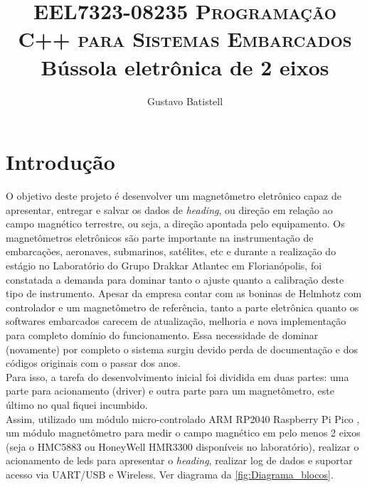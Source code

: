 \documentclass[10pt,twocolumn,letterpaper]{article}
\title{
		\usefont{OT1}{bch}{b}{n}
		\normalfont \normalsize \textsc{EEL7323-08235 Programação C++ para Sistemas Embarcados} \\ [10pt]
		\huge Bússola eletrônica de 2 eixos \\
}
\author[1]{Gustavo Batistell}
\affil[1]{UFSC - Universidade Federal de Santa Catarina \\
\newline Curso de Graduação em Engenharia Eletrônica}
\begin{document}
\maketitle

\section{Introdução}

O objetivo deste projeto é desenvolver um magnetômetro eletrônico capaz de apresentar, entregar e salvar os dados de \emph{heading}, 
ou direção em relação ao campo magnético terrestre, ou seja, a direção apontada pelo equipamento.
Os magnetômetros eletrônicos são parte importante na instrumentação de embarcações, aeronaves, submarinos, satélites, etc e durante 
a realização do estágio no Laboratório do Grupo Drakkar Atlantec em Florianópolis, foi constatada a demanda para dominar tanto o 
ajuste quanto a calibração deste tipo de instrumento. Apesar da empresa contar com as boninas de Helmhotz com controlador e um 
magnetômetro  de referência, tanto a parte eletrônica quanto os softwares embarcados carecem de atualização, melhoria e nova 
implementação para completo domínio do funcionamento. Essa necessidade de dominar (novamente) por completo o sistema surgiu devido 
perda de documentação e dos códigos originais com o passar dos anos. \\
Para isso, a tarefa do desenvolvimento inicial foi dividida em duas partes: uma parte para acionamento (driver) e outra parte para 
um magnetômetro, este último no qual fiquei incumbido.\\
Assim, utilizado um módulo micro-controlado ARM RP2040 Raspberry Pi Pico \cite{RP2040_Datasheet}, um módulo magnetômetro para medir 
o campo magnético em pelo menos 2 eixos (seja o HMC5883 ou HoneyWell HMR3300 \cite{HMR3300_Datasheet} disponíveis no laboratório), realizar o acionamento 
de leds para apresentar o \emph{heading}, realizar log de dados e suportar acesso via UART/USB e Wireless. Ver diagrama da 
\autoref{fig:Diagrama_blocos}.
\end{document}
